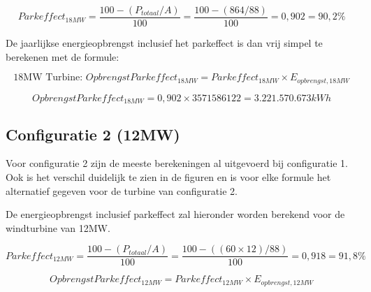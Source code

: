 \begin{equation} \label{eq:12}
 Parkeffect_{18MW} = \frac{100-(P_{totaal}/A)}{100} = \frac{100-(864/88)}{100} = 0,902 = 90,2\%
\end{equation}

De jaarlijkse energieopbrengst inclusief het parkeffect is dan vrij simpel te berekenen met de formule: 


\begin{equation} \label{13}
\text{18MW Turbine: } OpbrengstParkeffect_{18MW}=Parkeffect_{18MW}\times E_{opbrengst,18MW} 
\end{equation}

\begin{equation} \label{14}
OpbrengstParkeffect_{18MW}=0,902\times 3571586122 = 3.221.570.673 kWh 
\end{equation}

\subsection{Configuratie 2 (12MW)}
Voor configuratie 2 zijn de meeste berekeningen al uitgevoerd bij configuratie 1. Ook is het verschil duidelijk te zien in de figuren en is voor elke formule het alternatief gegeven voor de turbine van configuratie 2. 

De energieopbrengst inclusief parkeffect zal hieronder worden berekend voor de windturbine van 12MW. 

\begin{equation} \label{eq:15}
 Parkeffect_{12MW} = \frac{100-(P_{totaal}/A)}{100} = \frac{100-((60\times 12)/88)}{100} = 0,918 = 91,8\%
\end{equation}

\begin{equation} \label{eq:16}
OpbrengstParkeffect_{12MW}=Parkeffect_{12MW}\times E_{opbrengst,12MW}
\end{equation}

